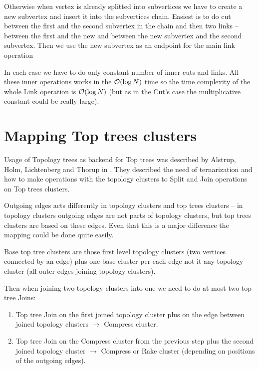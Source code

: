 Otherwise when vertex is already splitted into subvertices we have to create
a new subvertex and insert it into the subvertices chain. Easiest is to do cut
between the first and the second subvertex in the chain and then two links --
between the first and the new and between the new subvertex and the second subvertex.
Then we use the new subvertex as an endpoint for the main link operation

In each case we have to do only constant number of inner cuts and links. All
these inner operations works in the ${\cal O}(\log N)$ time so the time complexity of
the whole Link operation is ${\cal O}(\log N)$ (but as in the Cut's case the
multiplicative constant could be really large).

\section{Mapping Top trees clusters}

Usage of Topology trees as backend for Top trees was described by Alstrup, Holm,
Lichtenberg and Thorup in \cite{TopTrees}. They described the need of
ternarization and how to make operations with the topology clusters to Split and
Join operations on Top trees clusters.

Outgoing edges acts differently in topology clusters and top trees clusters --
in topology clusters outgoing edges are not parts of topology clusters, but
top trees clusters are based on these edges. Even that this is a major
difference the mapping could be done quite easily.

Base top tree clusters are those first level topology clusters (two vertices
connected by an edge) plus one base cluster per each edge not it any topology
cluster (all outer edges joining topology clusters).



Then when joining two topology clusters into one we need to do at most two
top tree Joins:
\begin{enumerate}
\item Top tree Join on the first joined topology cluster plus on the edge
between joined topology clusters $\rightarrow$ Compress cluster.
\item Top tree Join on the Compress cluster from the previous step plus the second
joined topology cluster $\rightarrow$ Compress or Rake cluster (depending on
positions of the outgoing edges).
\end{enumerate}


